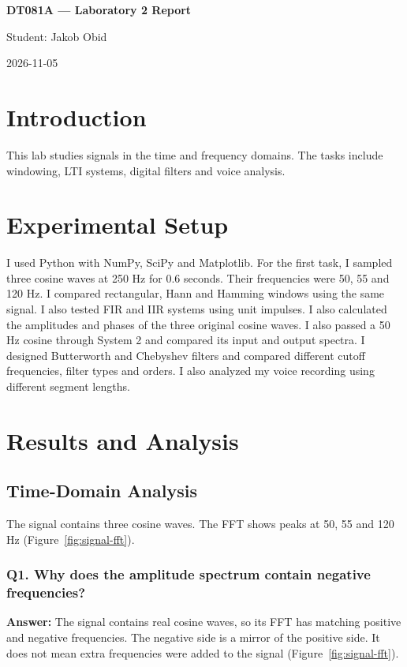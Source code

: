 \documentclass[11pt,a4paper]{article}
\begin{document}
\begin{center}
{\Large\bfseries DT081A --- Laboratory 2 Report\par}
Student: Jakob Obid\par
2026-11-05
\end{center}

\section{Introduction}
This lab studies signals in the time and frequency domains. The tasks include windowing, LTI systems, digital filters and voice analysis.

\section{Experimental Setup}
I used Python with NumPy, SciPy and Matplotlib. For the first task, I sampled three cosine waves at 250 Hz for 0.6 seconds. Their frequencies were 50, 55 and 120 Hz.
I compared rectangular, Hann and Hamming windows using the same signal.
I also tested FIR and IIR systems using unit impulses.
I also calculated the amplitudes and phases of the three original cosine waves.
I also passed a 50 Hz cosine through System 2 and compared its input and output spectra.
I designed Butterworth and Chebyshev filters and compared different cutoff frequencies, filter types and orders.
I also analyzed my voice recording using different segment lengths.

\section{Results and Analysis}
\subsection{Time-Domain Analysis}
The signal contains three cosine waves. The FFT shows peaks at 50, 55 and 120 Hz (Figure~\ref{fig:signal-fft}).

\subsubsection*{Q1. Why does the amplitude spectrum contain negative frequencies?}
\textbf{Answer:} The signal contains real cosine waves, so its FFT has matching positive and negative frequencies. The negative side is a mirror of the positive side. It does not mean extra frequencies were added to the signal (Figure~\ref{fig:signal-fft}).
\end{document}
